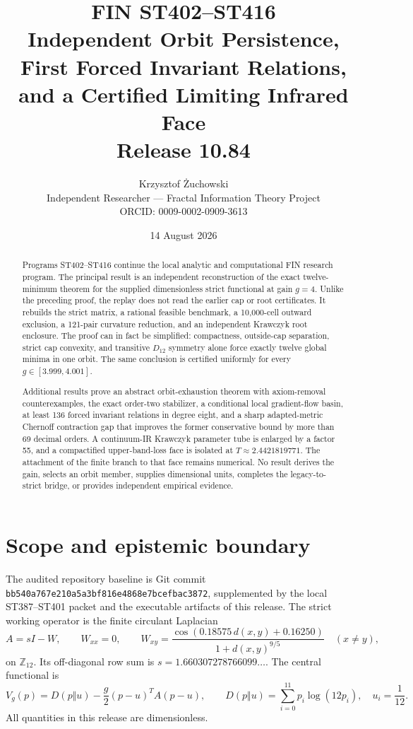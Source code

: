 \documentclass[11pt,a4paper]{article}
\title{\textbf{FIN ST402--ST416}\\[3pt]
Independent Orbit Persistence, First Forced Invariant Relations,\\
and a Certified Limiting Infrared Face\\[6pt]
\large Release 10.84}
\author{Krzysztof \.{Z}uchowski\\
\small Independent Researcher --- Fractal Information Theory Project\\
\small ORCID: 0009-0002-0909-3613}
\date{14 August 2026}
\begin{document}
\maketitle

\begin{abstract}
Programs ST402--ST416 continue the local analytic and computational FIN research
program.  The principal result is an independent reconstruction of the exact
twelve-minimum theorem for the supplied dimensionless strict functional at gain
$g=4$.  Unlike the preceding proof, the replay does not read the earlier cap or
root certificates.  It rebuilds the strict matrix, a rational feasible benchmark,
a 10,000-cell outward exclusion, a 121-pair curvature reduction, and an independent
Krawczyk root enclosure.  The proof can in fact be simplified: compactness,
outside-cap separation, strict cap convexity, and transitive $D_{12}$ symmetry alone
force exactly twelve global minima in one orbit.  The same conclusion is certified
uniformly for every $g\in[3.999,4.001]$.

Additional results prove an abstract orbit-exhaustion theorem with axiom-removal
counterexamples, the exact order-two stabilizer, a conditional local gradient-flow
basin, at least 136 forced invariant relations in degree eight, and a sharp
adapted-metric Chernoff contraction gap that improves the former conservative bound
by more than 69 decimal orders.  A continuum-IR Krawczyk parameter tube is enlarged
by a factor 55, and a compactified upper-band-loss face is isolated at
$T\approx2.4421819771$.  The attachment of the finite branch to that face remains
numerical.  No result derives the gain, selects an orbit member, supplies dimensional
units, completes the legacy-to-strict bridge, or provides independent empirical
evidence.
\end{abstract}

\tableofcontents
\newpage

\section{Scope and epistemic boundary}

The audited repository baseline is Git commit
\texttt{bb540a767e210a5a3bf816e4868e7bcefbac3872}, supplemented by the local
ST387--ST401 packet and the executable artifacts of this release.  The strict
working operator is the finite circulant Laplacian
\begin{equation}\label{eq:A}
 A=sI-W,\qquad W_{xx}=0,\qquad
 W_{xy}=\frac{\cos(0.18575\,d(x,y)+0.16250)}{1+d(x,y)^{9/5}}\quad(x\ne y),
\end{equation}
on $\mathbb Z_{12}$.  Its off-diagonal row sum is
$s=1.660307278766099\ldots$.  The central functional is
\begin{equation}\label{eq:Vg}
 V_g(p)=D(p\Vert u)-\frac g2(p-u)^TA(p-u),\qquad
 D(p\Vert u)=\sum_{i=0}^{11}p_i\log(12p_i),\quad u_i=\frac1{12}.
\end{equation}
All quantities in this release are dimensionless.
\end{document}
